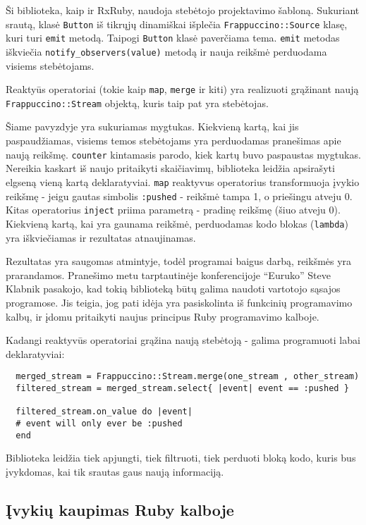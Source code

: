 Ši biblioteka, kaip ir RxRuby, naudoja stebėtojo projektavimo šabloną. Sukuriant srautą, klasė \lstinline|Button| iš tikrųjų dinamiškai išplečia \lstinline|Frappuccino::Source| klasę, kuri turi \lstinline|emit| metodą. Taipogi \lstinline|Button| klasė paverčiama tema. \lstinline|emit| metodas iškviečia \lstinline|notify_observers(value)| metodą ir nauja reikšmė perduodama visiems stebėtojams.

Reaktyūs operatoriai (tokie kaip \lstinline|map|, \lstinline|merge| ir kiti) yra realizuoti grąžinant naują \lstinline|Frappuccino::Stream| objektą, kuris taip pat yra stebėtojas.

Šiame pavyzdyje yra sukuriamas mygtukas. Kiekvieną kartą, kai jis paspaudžiamas, visiems temos stebėtojams yra perduodamas pranešimas apie naują reikšmę. \lstinline|counter| kintamasis parodo, kiek kartų buvo paspaustas mygtukas. Nereikia kaskart iš naujo pritaikyti skaičiavimų, biblioteka leidžia apsirašyti elgseną vieną kartą deklaratyviai. \lstinline|map| reaktyvus operatorius transformuoja įvykio reikšmę - jeigu gautas simbolis \lstinline|:pushed| - reikšmė tampa 1, o priešingu atveju 0. Kitas operatorius \lstinline|inject| priima parametrą - pradinę reikšmę (šiuo atveju 0). Kiekvieną kartą, kai yra gaunama reikšmė, perduodamas kodo blokas (\lstinline|lambda|) yra iškviečiamas ir rezultatas atnaujinamas.

Rezultatas yra saugomas atmintyje, todėl programai baigus darbą, reikšmės yra prarandamos. Pranešimo metu tarptautinėje konferencijoje ``Euruko'' Steve Klabnik pasakojo, kad tokią biblioteką būtų galima naudoti vartotojo sąsajos programose. Jis teigia, jog pati idėja yra pasiskolinta iš funkcinių programavimo kalbų, ir įdomu pritaikyti naujus principus Ruby programavimo kalboje.

Kadangi reaktyvūs operatoriai grąžina naują stebėtoją - galima programuoti labai deklaratyviai:

\begin{lstlisting}
  merged_stream = Frappuccino::Stream.merge(one_stream , other_stream)
  filtered_stream = merged_stream.select{ |event| event == :pushed }

  filtered_stream.on_value do |event|
  # event will only ever be :pushed
  end
\end{lstlisting}

Biblioteka leidžia tiek apjungti, tiek filtruoti, tiek perduoti bloką kodo, kuris bus įvykdomas, kai tik srautas gaus naują informaciją.

\subsection{Įvykių kaupimas Ruby kalboje}

